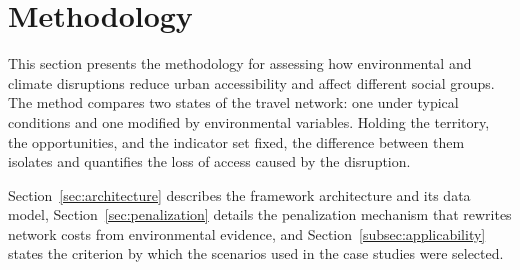\section{Methodology}
\label{sec:methodology}

This section presents the methodology for assessing how environmental and climate disruptions reduce urban accessibility and affect different social groups. The method compares two states of the travel network: one under typical conditions and one modified by environmental variables. Holding the territory, the opportunities, and the indicator set fixed, the difference between them isolates and quantifies the loss of access caused by the disruption.

Section~\ref{sec:architecture} describes the framework architecture and its data model, Section~\ref{sec:penalization} details the penalization mechanism that rewrites network costs from environmental evidence, and Section~\ref{subsec:applicability} states the criterion by which the scenarios used in the case studies were selected.




